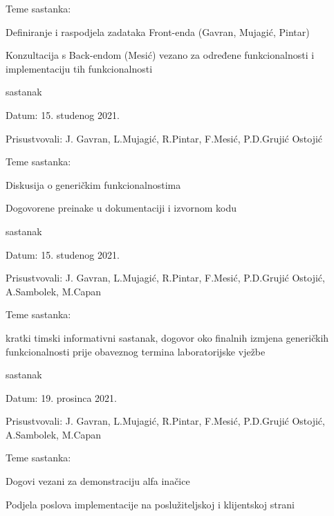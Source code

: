\begin{packed_enum}
\begin{packed_item}
    			\item Teme sastanka:
    			\begin{packed_item}
    				\item Definiranje i raspodjela zadataka Front-enda (Gavran, Mujagić, Pintar)
    				\item Konzultacija s Back-endom (Mesić) vezano za određene funkcionalnosti i implementaciju tih funkcionalnosti 
    			\end{packed_item}
    		\end{packed_item}	
    		\item  sastanak
    		\item[] \begin{packed_item}
    			\item Datum: 15. studenog 2021.
    			\item Prisustvovali: J. Gavran, L.Mujagić, R.Pintar, F.Mesić, P.D.Grujić Ostojić
    			\item Teme sastanka:
    			\begin{packed_item}
    				\item Diskusija o generičkim funkcionalnostima 
    				\item Dogovorene preinake u dokumentaciji i izvornom kodu
    			\end{packed_item}
    		\end{packed_item}	
    	
	    	\item  sastanak
	    	\item[] \begin{packed_item}
	    		\item Datum: 15. studenog 2021.
	    		\item Prisustvovali: J. Gavran, L.Mujagić, R.Pintar, F.Mesić, P.D.Grujić Ostojić, A.Sambolek, M.Capan
	    		\item Teme sastanka:
	    		\begin{packed_item}
	    			\item kratki timski informativni sastanak, dogovor oko finalnih izmjena generičkih funkcionalnosti prije obaveznog termina laboratorijske vježbe
	    		\end{packed_item}
	    	\end{packed_item}	
		\item sastanak
		\item[] \begin{packed_item}
    			\item Datum: 19. prosinca 2021.
    			\item Prisustvovali: J. Gavran, L.Mujagić, R.Pintar, F.Mesić, P.D.Grujić Ostojić, A.Sambolek, M.Capan
    			\item Teme sastanka:
    			\begin{packed_item}
    				\item Dogovi vezani za demonstraciju alfa inačice
    				\item Podjela poslova implementacije na poslužiteljskoj i klijentskoj strani
    			\end{packed_item}
    		\end{packed_item}
    	

\end{packed_enum}
